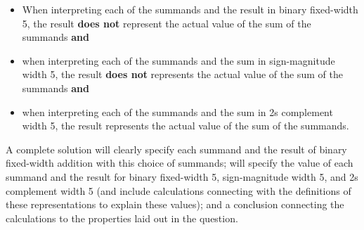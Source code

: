 \documentclass[12pt, oneside]{article}
\begin{document}
\begin{enumerate}[labelindent=0pt, leftmargin=0pt]
\begin{enumerate}
            \begin{itemize}
            \item[(1)] When interpreting each of the summands and the result in binary fixed-width 5, 
            the result {\bf does not} represent the actual value of the sum of the summands {\bf and}
            \item[(2)] when interpreting each of the summands and the sum in sign-magnitude width 5, the result  
            {\bf does not} represents the actual value of the sum of the summands {\bf and}
            \item[(3)] when interpreting each of the summands and the sum in 2s complement width 5, the result 
            represents the actual value of the sum of the summands.
            \end{itemize}
            A complete solution will clearly specify each summand and the result of binary fixed-width addition 
            with this choice of summands; will specify  the value of each summand and the result for 
            binary fixed-width 5, 
            sign-magnitude width 5, and 2s complement width 5 (and include calculations connecting with the 
            definitions of these representations to explain these values); and a conclusion connecting
            the calculations to the properties laid out in the question.
        \end{enumerate}  
\end{enumerate}
\end{document}
